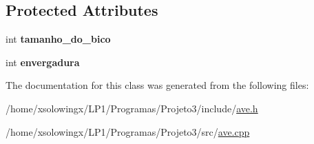 \subsection*{Protected Attributes}
\begin{DoxyCompactItemize}
\item 
\mbox{\label{classAve_ad31143f96b75f003b87d3823a7af1ae8}} 
int {\bfseries tamanho\+\_\+do\+\_\+bico}
\item 
\mbox{\label{classAve_acd66c7ac8887d8eecbe3e15a8508b25d}} 
int {\bfseries envergadura}
\end{DoxyCompactItemize}


The documentation for this class was generated from the following files\+:\begin{DoxyCompactItemize}
\item 
/home/xsolowingx/\+L\+P1/\+Programas/\+Projeto3/include/\hyperlink{ave_8h}{ave.\+h}\item 
/home/xsolowingx/\+L\+P1/\+Programas/\+Projeto3/src/\hyperlink{ave_8cpp}{ave.\+cpp}\end{DoxyCompactItemize}
